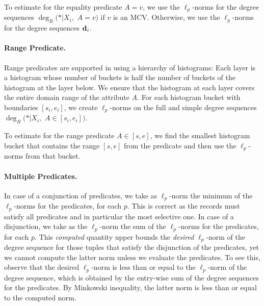 To estimate for the equality predicate $A=v$, we use the $\ell_p$-norms for the degree sequences $\deg_R(*|X_i,$ $A=v)$ if $v$ is an MCV. Otherwise, we use the $\ell_p$-norms for the degree sequences ${\bf d}_i$. 

\paragraph{Range Predicate.} Range predicates are supported in \system using a hierarchy of histograms: Each layer is a histogram whose number of buckets is half the number of buckets of the histogram at the layer below. We ensure that the histogram at each layer covers the entire domain range of the attribute $A$. For each histogram bucket with boundaries $[s_i,e_i]$, we create $\ell_p$-norms on the full and simple degree sequences $\deg_R(*|X_i,$ $A\in [s_i,e_i])$.

To estimate for the range predicate $A\in [s,e]$, we find the smallest histogram bucket that contains the range $[s,e]$ from the predicate and then use the $\ell_p$-norms from that bucket.

\paragraph{Multiple Predicates.} In case of a conjunction of  predicates, we take as $\ell_p$-norm the minimum of the $\ell_p$-norms for the predicates, for each $p$. This is correct as the records must satisfy all predicates and in particular the most selective one. In case of a disjunction, we take as the $\ell_p$-norm the sum of the $\ell_p$-norms for the predicates, for each $p$. This {\em computed} quantity upper bounds the {\em desired} $\ell_p$-norm of the degree sequence for those tuples that satisfy the disjunction of the predicates, yet we cannot compute the latter norm unless we evaluate the predicates. To see this, observe that the desired $\ell_p$-norm is less than or equal to the $\ell_p$-norm of the degree sequence, which is obtained by the entry-wise sum of the degree sequences for the predicates. By Minkowski inequality, the latter norm is less than or equal to the computed norm.


